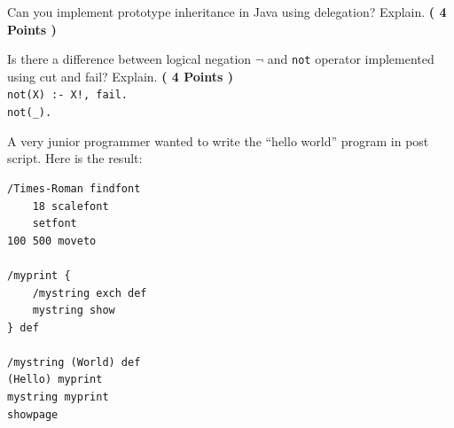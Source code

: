 \documentclass [11pt, a4wide, twoside]{article}
\begin{document}
\begin{myenumerate}

\item Can you implement prototype inheritance in Java using delegation? Explain. \textbf{( 4 Points )}
 \vspace{2.5cm}


\item Is there a difference between logical negation \texttt{$\neg$} and \texttt{not} operator implemented using cut and fail? Explain. \textbf{( 4 Points )} \\
\texttt{not(X) :- X!, fail. } \\
\texttt{not(\_).}
 \vspace{2.5cm}


\end{myenumerate}


\newpage

\noindent
%

A very junior programmer wanted to write the ``hello world'' program in post script. Here is the result: 

\begin{small}
\begin{verbatim}
/Times-Roman findfont
    18 scalefont
    setfont
100 500 moveto

/myprint {
    /mystring exch def
    mystring show
} def

/mystring (World) def
(Hello) myprint
mystring myprint
showpage
\end{verbatim}
\end{small}
\end{document}
